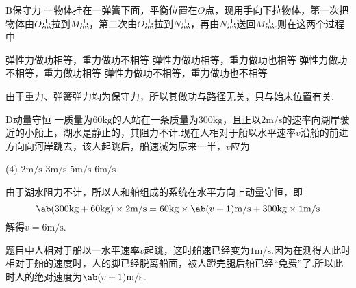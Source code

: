 {\hspace{-2.16em}
\begin{minipage}{0.67\textwidth}
\begin{choice}{B}{保守力}
    一物体挂在一弹簧下面，平衡位置在$O$点，现用手向下拉物体，第一次把物体由$O$点拉到$M$点，第二次由$O$点拉到$N$点，再由$N$点送回$M$点.则在这两个过程中
    \begin{tasks}
        \task 弹性力做功相等，重力做功不相等
        \task 弹性力做功相等，重力做功也相等
        \task 弹性力做功不相等，重力做功相等
        \task 弹性力做功不相等，重力做功也不相等
    \end{tasks}
\end{choice}
\end{minipage}
\hfill
\begin{minipage}[c]{0.33\textwidth}
\begin{center}
\end{center}
\end{minipage}
\begin{solution}
    由于重力、弹簧弹力均为保守力，所以其做功与路径无关，只与始末位置有关.
\end{solution}

\begin{choice}{D}{动量守恒}
    一质量为$60\mathrm{kg}$的人站在一条质量为$300\mathrm{kg}$，且正以$2\mathrm{m/s}$的速率向湖岸驶近的小船上，湖水是静止的，其阻力不计.现在人相对于船以水平速率$v$沿船的前进方向向河岸跳去，该人起跳后，船速减为原来一半，$v$应为
    \begin{tasks}(4)
        \task $2\mathrm{m/s}$
        \task $3\mathrm{m/s}$
        \task $5\mathrm{m/s}$
        \task $6\mathrm{m/s}$
    \end{tasks}
\end{choice}
\begin{solution}
    由于湖水阻力不计，所以人和船组成的系统在水平方向上动量守恒，即
    $$\ab(300\mathrm{kg}+60\mathrm{kg})\times 2\mathrm{m/s}=60\mathrm{kg}\times\ab(v+1)\mathrm{m/s}+300\mathrm{kg}\times 1\mathrm{m/s}$$
    解得$v=6\mathrm{m/s}$.
\end{solution}
\begin{note}
    题目中人相对于船以一水平速率$v$起跳，这时船速已经变为$1\mathrm{m/s}$.因为在测得人此时相对于船的速度时，人的脚已经脱离船面，被人蹬完腿后船已经“免费”了.所以此时人的绝对速度为$\ab(v+1)\mathrm{m/s}$.
\end{note}

}
